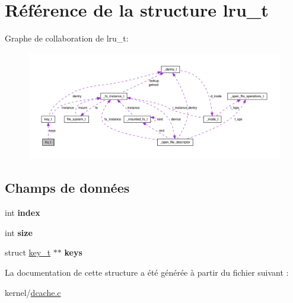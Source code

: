 \hypertarget{structlru__t}{\section{Référence de la structure lru\-\_\-t}
\label{structlru__t}
}


Graphe de collaboration de lru\-\_\-t\-:
\nopagebreak
\begin{figure}[H]
\begin{center}
\leavevmode
\includegraphics[width=350pt]{structlru__t__coll__graph}
\end{center}
\end{figure}
\subsection*{Champs de données}
\begin{DoxyCompactItemize}
\item 
\hypertarget{structlru__t_acf3186bcc787c56bcd638b109f8072ff}{int {\bfseries index}}\label{structlru__t_acf3186bcc787c56bcd638b109f8072ff}

\item 
\hypertarget{structlru__t_a299ea859f14004fb313cdb0242ae67e8}{int {\bfseries size}}\label{structlru__t_a299ea859f14004fb313cdb0242ae67e8}

\item 
\hypertarget{structlru__t_a268635bc2b2a850faf194cd4fcc5ff57}{struct \hyperlink{structkey__t}{key\-\_\-t} $\ast$$\ast$ {\bfseries keys}}\label{structlru__t_a268635bc2b2a850faf194cd4fcc5ff57}

\end{DoxyCompactItemize}


La documentation de cette structure a été générée à partir du fichier suivant \-:\begin{DoxyCompactItemize}
\item 
kernel/\hyperlink{dcache_8c}{dcache.\-c}\end{DoxyCompactItemize}
